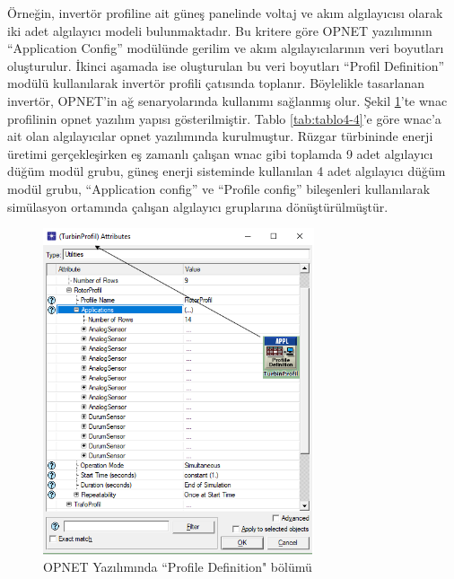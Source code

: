 Örneğin, invertör profiline ait güneş panelinde voltaj ve akım algılayıcısı olarak iki adet algılayıcı modeli bulunmaktadır. Bu kritere göre OPNET yazılımının “Application Config” modülünde gerilim ve akım algılayıcılarının veri boyutları oluşturulur. İkinci aşamada ise oluşturulan bu veri boyutları “Profil Definition” modülü kullanılarak invertör profili çatısında toplanır. Böylelikle tasarlanan invertör, OPNET’in ağ senaryolarında kullanımı sağlanmış olur. Şekil \ref{fig:4-5}’te \gls{wnac} profilinin \gls{opnet} yazılım yapısı gösterilmiştir. Tablo \ref{tab:tablo4-4}’e göre \gls{wnac}'a ait olan algılayıcılar \gls{opnet} yazılımında kurulmuştur. Rüzgar türbininde enerji üretimi gerçekleşirken eş zamanlı çalışan \gls{wnac} gibi toplamda 9 adet algılayıcı düğüm modül grubu, güneş enerji sisteminde kullanılan 4 adet algılayıcı düğüm modül grubu, “Application config” ve “Profile config” bileşenleri kullanılarak simülasyon ortamında çalışan algılayıcı gruplarına dönüştürülmüştür.
\begin{figure}[htbp]
\centerline{\includegraphics[width=8cm]{Resim/sekil4-5.png}}
\caption{OPNET Yazılımında “Profile Definition" bölümü}
\label{fig:4-5}
\end{figure}